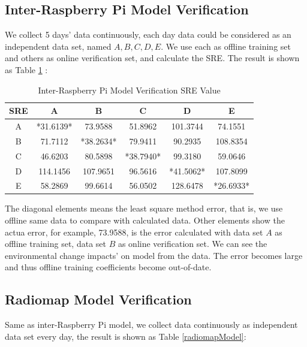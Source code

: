 \documentclass[10pt,conference]{IEEEtran}
\begin{document}
\subsection{Inter-Raspberry Pi Model Verification}
We collect 5 days' data continuously, each day data could be considered as an independent data set, named $A,B,C,D,E$. We use each as offline training set and others as online verification set, and calculate the SRE. The result is shown as Table \ref{interModel} : \\

\begin{table}[!hbp]
\centering
\begin{tabular}{|c|c|c|c|c|c|}
    	\hline
	SRE & A & B & C & D & E \\
	\hline
	A & *31.6139* & 73.9588 & 51.8962 &101.3744 & 74.1551 \\
    	\hline
	B & 71.7112 & *38.2634* & 79.9411 & 90.2935 & 108.8354 \\
    	\hline
	C & 46.6203 & 80.5898 & *38.7940* & 99.3180 & 59.0646 \\
	\hline
	D & 114.1456 & 107.9651 & 96.5616 & *41.5062* & 107.8099 \\
	\hline
	E & 58.2869 & 99.6614 & 56.0502 &128.6478 & *26.6933* \\
	\hline
\end{tabular}
\caption{Inter-Raspberry Pi Model Verification SRE Value}\label{interModel}
\end{table}

The diagonal elements means the least square method error, that is, we use offline same data to compare with calculated data. Other elements show the actua error, for example, 73.9588, is the error calculated with data set $A$ as offline training set, data set $B$ as online verification set.
We can see the environmental change impacts' on model from the data. The error becomes large and thus offline training coefficients become out-of-date.


\subsection{Radiomap Model Verification}
Same as inter-Raspberry Pi model, we collect data continuously as independent data set every day, the result is shown as Table \ref{radiomapModel}: \\
\end{document}
